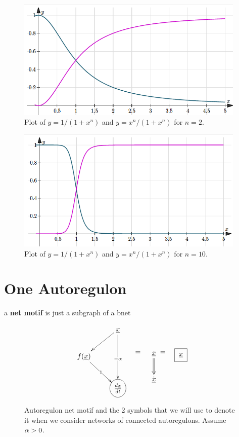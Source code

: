 \begin{figure}[h!]
\centering
\includegraphics[width=4.3in]
{autoregulons/hill-2.png}
\caption{Plot of $y= 1/(1+x^n)$
and $y=x^n/(1+x^n)$ for $n=2$.}
\label{fig-hill-2.png}
\end{figure}

\begin{figure}[h!]
\centering
\includegraphics[width=4.3in]
{autoregulons/hill-10.png}
\caption{Plot of $y= 1/(1+x^n)$
and $y=x^n/(1+x^n)$ for $n=10$.}
\label{fig-hill-10.png}
\end{figure}

\section{One Autoregulon}
a {\bf net motif} is just a subgraph of a bnet

\begin{figure}[h!]
$$
\xymatrix{
&\rvx\ar[dd]|{-\alp}\ar[dl]
\\
f(\rvx)\ar[dr]|{1}
\\
&\Circle{\frac{d\rvx}{dt}}
}\quad
\xymatrix{\\=}
\quad
\xymatrix{
\\
\rvx\ar@{=>}[d]
\\
\dot{\rvx}
}
\xymatrix{\\=}
\quad
\xymatrix{\\\Rect{\rvx}}
$$
\caption{Autoregulon net motif and the 2 symbols that we will
use to denote it when we consider
networks of connected autoregulons. Assume $\alpha >0$.}
\label{fig-net-motif}
\end{figure}

